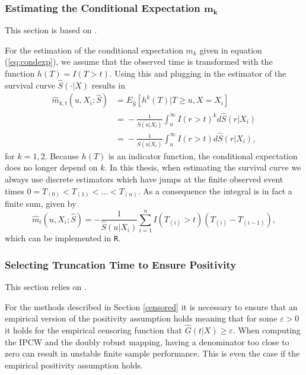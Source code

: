 \documentclass[12pt, a4paper]{scrartcl}
\theoremstyle{definition}
\theoremstyle{plain}
\numberwithin{equation}{section}
\numberwithin{figure}{section}
\numberwithin{table}{section}
\begin{document}
	\subsubsection{Estimating the Conditional Expectation $\mathbf{m_k}$}
	
	This section is based on \citet*{drtrees}.
	
	For the estimation of the conditional expectation $m_k$ given in equation (\ref{eq:condexp}), we assume that the observed time is transformed with the function $h(T) = I(T>t)$.
	Using this and plugging in the estimator of the survival curve $\hat{S}(\cdot\vert X)$ results in
	\begin{equation*}
	\begin{split}
	\hat{m}_{k,t} (u, X_i; \hat{S}) &={} E_{\hat{S}}[h^k(T)\vert T \geq u, X=X_i]\\
	&={}-\frac{1}{\hat{S}(u\vert X_i)}\int_u^{\infty}I(r> t)^kd\hat{S}(r\vert X_i)\\
	&={}-\frac{1}{\hat{S}(u\vert X_i)}\int_u^{\infty}I(r> t)d\hat{S}(r\vert X_i),
	\end{split}
	\end{equation*}
	for $k=1,2$.
	Because $h(T)$ is an indicator function, the conditional expectation does no longer depend on $k$.
	In this thesis, when estimating the survival curve we always use discrete estimators which have jumps at the finite observed event times $0=T_{(0)}<T_{(1)}<\dots<T_{(n)}$.
	As a consequence the integral is in fact a finite sum, given by
	\begin{equation*}
	\hat{m}_t (u, X_i; \hat{S}) = -\frac{1}{\hat{S}(u\vert X_i)}\sum_{i=1}^n I(T_{(i)}>t)(T_{(i)}-T_{(i-1)}),
	\end{equation*}
	which can be implemented in \texttt{R}.
	
	\subsubsection{Selecting Truncation Time to Ensure Positivity}
	
	This section relies on \citet*{drtrees}.
	
	For the methods described in Section \ref{censored} it is necessary to ensure that an empirical version of the positivity assumption holds meaning that for some $\varepsilon>0$ it holds for the empirical censoring function that $\hat{G}(t\vert X) \geq \varepsilon$.
	When computing the IPCW and the doubly robust mapping, having a denominator too close to zero can result in unstable finite sample performance.
	This is even the case if the empirical positivity assumption holds.
	
\end{document}
